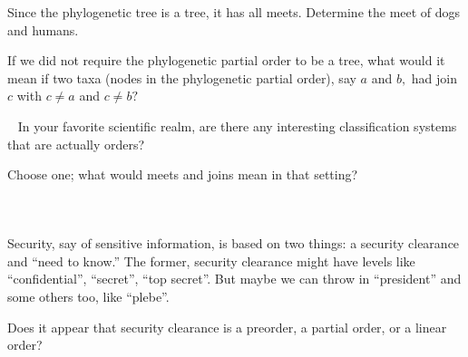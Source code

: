 \documentclass[CT4S-EN-RU]{subfiles}
\begin{document}
\begin{blockRUS}
\end{blockRUS}

\begin{exerciseENG}
Since the phylogenetic tree is a tree, it has all meets.
\sexc Determine the meet of dogs and humans. 
\item If we did not require the phylogenetic partial order to be a tree, what would it mean if two taxa (nodes in the phylogenetic partial order), say $a$ and $b,$ had join $c$ with $c\neq a$ and $c\neq b?$
\endsexc
\end{exerciseENG}

\begin{exerciseRUS}
\end{exerciseRUS}

\begin{exerciseENG}~
\sexc In your favorite scientific realm, are there any interesting classification systems that are actually orders? 
\item Choose one; what would meets and joins mean in that setting?
\endsexc
\end{exerciseENG}

\begin{exerciseRUS}~
\end{exerciseRUS}


\subsubsection{}

\begin{blockENG}
Security, say of sensitive information, is based on two things: a security clearance and “need to know.” The former, security clearance might have levels like “confidential”, “secret”, “top secret”. But maybe we can throw in “president” and some others too, like “plebe”. 
\end{blockENG}

\begin{blockRUS}
\end{blockRUS}

\begin{exerciseENG}
Does it appear that security clearance is a preorder, a partial order, or a linear order?
\end{exerciseENG}

\begin{exerciseRUS}
\end{exerciseRUS}
\end{document}

